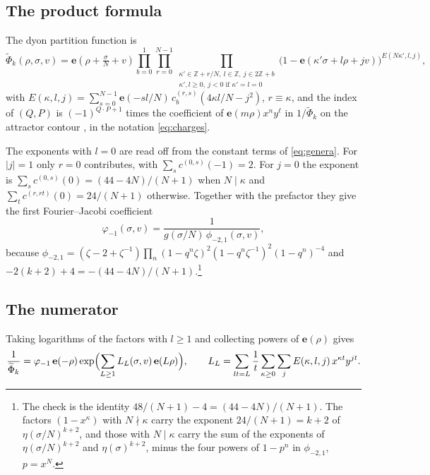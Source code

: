 \documentclass[mathematics,article,submit,pdftex,oneauthor]{Definitions/mdpi}
\numberwithin{equation}{section}
\theoremstyle{plain}
\theoremstyle{remark}
\newcommand{\Z}{\mathbb{Z}}
\newcommand{\e}{\mathbf{e}}
\newcommand{\pmi}{\phi_{-2,1}}
\newcommand{\tPhi}{\widetilde{\Phi}}
\begin{document}
\subsection{The product formula}
The dyon partition function is \cite{DJS06}
\begin{equation}\label{eq:product}
\tPhi_k(\rho,\sigma,v)=\e\!\left(\rho+\tfrac{\sigma}{N}+v\right)\prod_{b=0}^{1}\prod_{r=0}^{N-1}\prod_{\substack{\kappa'\in\Z+r/N,\ l\in\Z,\ j\in2\Z+b\\ \kappa',l\ge0,\ j<0\text{ if }\kappa'=l=0}}\bigl(1-\e(\kappa'\sigma+l\rho+jv)\bigr)^{E(N\kappa',l,j)},
\end{equation}
with $E(\kappa,l,j)=\sum_{s=0}^{N-1}\e(-sl/N)\,c_b^{(r,s)}(4\kappa l/N-j^2)$, $r\equiv\kappa$, and the index of $(Q,P)$ is $(-1)^{Q\cdot P+1}$ times the coefficient of $\e(m\rho)x^ny^\ell$ in $1/\tPhi_k$ on the attractor contour \cite{JS06,DJS06,Sen08}, in the notation \eqref{eq:charges}.

The exponents with $l=0$ are read off from the constant terms of \eqref{eq:genera}. For $|j|=1$ only $r=0$ contributes, with $\sum_s c^{(0,s)}(-1)=2$. For $j=0$ the exponent is $\sum_sc^{(0,s)}(0)=(44-4N)/(N+1)$ when $N\mid\kappa$ and $\sum_t c^{(r,rt)}(0)=24/(N+1)$ otherwise. Together with the prefactor they give the first Fourier--Jacobi coefficient
\begin{equation}\label{eq:phim1}
\varphi_{-1}(\sigma,v)=\frac{1}{g(\sigma/N)\,\pmi(\sigma,v)},
\end{equation}
because $\pmi=(\zeta-2+\zeta^{-1})\prod_n(1-q^n\zeta)^2(1-q^n\zeta^{-1})^2(1-q^n)^{-4}$ and $-2(k+2)+4=-(44-4N)/(N+1)$.\footnote{The check is the identity $48/(N+1)-4=(44-4N)/(N+1)$. The factors $(1-x^\kappa)$ with $N\nmid\kappa$ carry the exponent $24/(N+1)=k+2$ of $\eta(\sigma/N)^{k+2}$, and those with $N\mid\kappa$ carry the sum of the exponents of $\eta(\sigma/N)^{k+2}$ and $\eta(\sigma)^{k+2}$, minus the four powers of $1-p^n$ in $\pmi$, $p=x^N$.}

\subsection{The numerator}
Taking logarithms of the factors with $l\ge1$ and collecting powers of $\e(\rho)$ gives
\begin{equation}\label{eq:exp}
\frac{1}{\tPhi_k}=\varphi_{-1}\,\e(-\rho)\exp\Bigl(\sum_{L\ge1}L_L(\sigma,v)\,\e(L\rho)\Bigr),
\qquad L_L=\sum_{lt=L}\frac1t\sum_{\kappa\ge0}\sum_jE(\kappa,l,j)\,x^{\kappa t}y^{jt}.
\end{equation}
\end{document}

